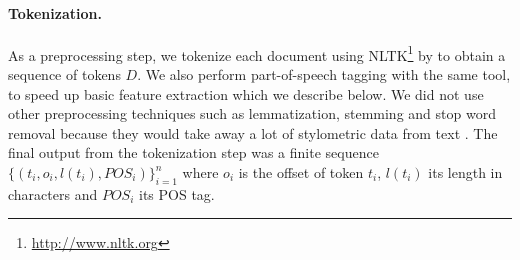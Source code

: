 \documentclass[10pt, a4paper]{article}
\begin{document}
\paragraph{Tokenization.} As a preprocessing step, we tokenize each document using NLTK\footnote{\url{http://www.nltk.org}} by \citet{bird-2009} to obtain a sequence of tokens $D$. We also perform part-of-speech tagging with the same tool, to speed up basic feature extraction which we describe below. We did not use other preprocessing techniques such as lemmatization, stemming and stop word removal because they would take away a lot of stylometric data from text \cite{stamatatos-2009a}. The final output from the tokenization step was a finite sequence $\{(t_i, o_i, l(t_i), \mathit{POS}_i)\}_{i=1}^n$ where $o_i$ is the offset of token $t_i$, $l(t_i)$ its length in characters and $\mathit{POS}_i$ its POS tag.
\end{document}
